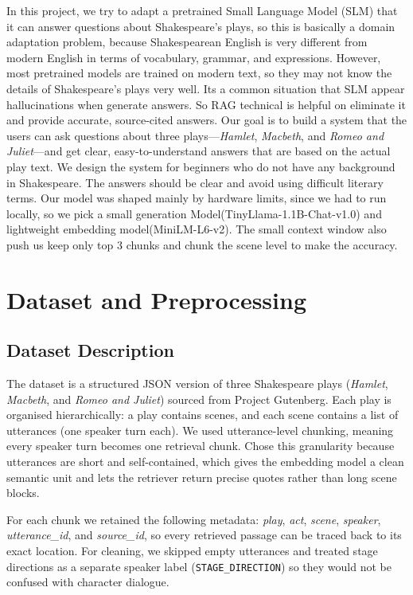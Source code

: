 \documentclass[10pt,conference]{IEEEtran}
\begin{document}
In this project, we try to adapt a pretrained Small Language Model (SLM) that it can answer questions about Shakespeare's plays, so this is basically a domain adaptation problem,
because Shakespearean English is very different from modern
English in terms of vocabulary, grammar, and expressions.
However, most pretrained models are trained on modern text, so they
may not know the details of Shakespeare’s plays very well. Its a common situation that SLM appear hallucinations when generate answers. So RAG technical is helpful on eliminate it and provide accurate, source-cited answers.
Our goal is to build a system that the users can ask questions about three plays---\textit{Hamlet}, \textit{Macbeth}, and \textit{Romeo and Juliet}---and get clear, easy-to-understand answers that are based on the actual play text. We design the system for beginners who do not have any background in Shakespeare. The answers should be clear and avoid using difficult literary terms.
Our model was shaped mainly by hardware limits, since we had to run locally, so we pick a small generation Model(TinyLlama-1.1B-Chat-v1.0) and lightweight embedding model(MiniLM-L6-v2). The small context window also push us keep only top 3 chunks and chunk the scene level to make the accuracy. 

\section{Dataset and Preprocessing}
\label{sec:dataset}

\subsection{Dataset Description}

The dataset is a structured JSON version of three Shakespeare plays (\textit{Hamlet}, \textit{Macbeth}, and \textit{Romeo and Juliet}) sourced from Project Gutenberg. Each play is organised hierarchically: a play contains scenes, and each scene contains a list of utterances (one speaker turn each). We used utterance-level chunking, meaning every speaker turn becomes one retrieval chunk. Chose this granularity because utterances are short and self-contained, which gives the embedding model a clean semantic unit and lets the retriever return precise quotes rather than long scene blocks.

For each chunk we retained the following metadata: \textit{play}, \textit{act}, \textit{scene}, \textit{speaker}, \textit{utterance\_id}, and \textit{source\_id}, so every retrieved passage can be traced back to its exact location. For cleaning, we skipped empty utterances and treated stage directions as a separate speaker label (\texttt{STAGE\_DIRECTION}) so they would not be confused with character dialogue.
\end{document}
